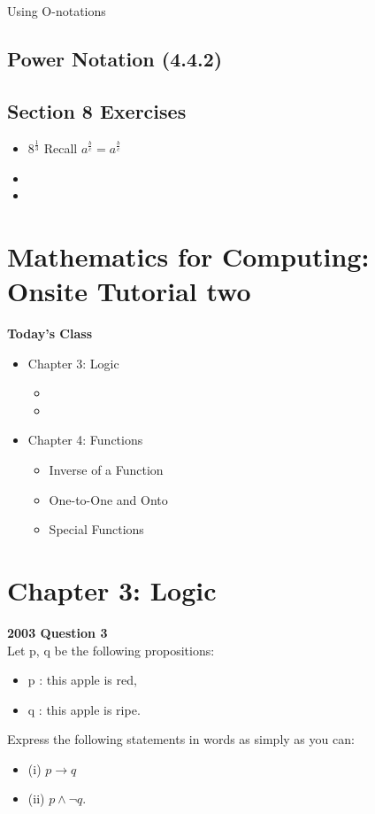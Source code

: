 \documentclass{article}
\begin{document}
Using O-notations

\subsection*{Power Notation (4.4.2)}


\subsection*{Section 8 Exercises}
\begin{itemize}
\item $8^{\frac{1}{3}}$ Recall $a^{\frac{b}{c}} = a^{\frac{b}{c}}$
\item
\item
\end{itemize}


\section{Mathematics for Computing: Onsite Tutorial two}

\textbf{Today's Class}
\begin{itemize}
\item Chapter 3: Logic
\begin{itemize}
\item
\item
\end{itemize}
\item Chapter 4: Functions
\begin{itemize}
\item Inverse of a Function
\item One-to-One and Onto
\item Special Functions
\end{itemize}
\end{itemize}
\newpage
\section{Chapter 3: Logic}

\textbf{2003 Question 3}\\
Let p, q be the following propositions:
\begin{itemize}
\item p : this apple is red, 
\item q : this apple is ripe.
\end{itemize}

Express the following statements in words as simply as you can:
\begin{itemize}
\item (i) $p \rightarrow q$
\item (ii) $p \wedge \neg q$.
\end{itemize}
\end{document}

